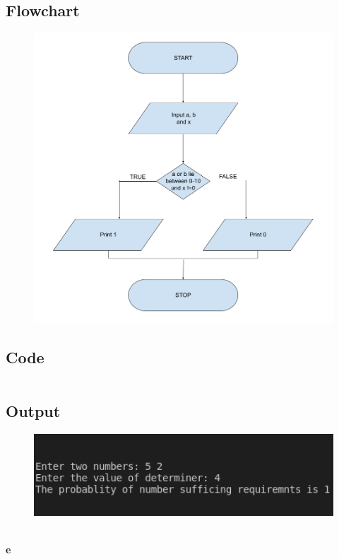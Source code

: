 \documentclass[12pt]{article}
\begin{document}
\subsection{Flowchart}
\begin{figure}[h]
    \centering
    \includegraphics[width=1.0\textwidth]{Flowchart04d.png}
\end{figure}
\newpage
\subsection{Code}
\inputminted{c}{q4d.c}
\subsection{Output}
\begin{figure}[h]
    \centering
    \includegraphics[width=1.0\textwidth]{4d.png}
\end{figure}\\ \newline
\newpage
\textbf{e}
\end{document}
